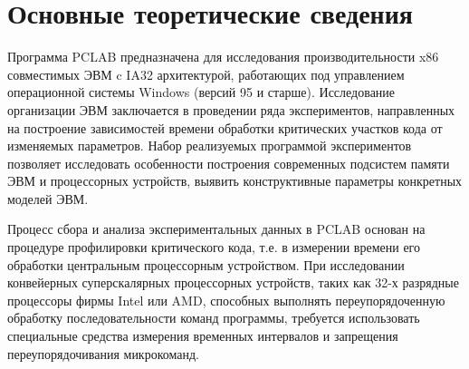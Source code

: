 \chapter*{Основные теоретические сведения}
Программа PCLAB предназначена для исследования производительности x86 совместимых ЭВМ c IA32 архитектурой, работающих под управлением операционной системы Windows (версий 95 и старше). Исследование организации ЭВМ заключается в проведении ряда экспериментов, направленных на построение зависимостей времени обработки критических участков кода от изменяемых параметров. Набор реализуемых программой экспериментов позволяет исследовать особенности построения современных подсистем памяти ЭВМ и процессорных устройств, выявить конструктивные параметры конкретных моделей ЭВМ. 

Процесс сбора и анализа экспериментальных данных в PCLAB основан на процедуре профилировки критического кода, т.е. в измерении времени его обработки центральным процессорным устройством. При исследовании конвейерных суперскалярных процессорных устройств, таких как 32-х разрядные процессоры фирмы Intel или AMD, способных выполнять переупорядоченную обработку последовательности команд программы, требуется использовать специальные средства измерения временных интервалов и запрещения переупорядочивания микрокоманд. 